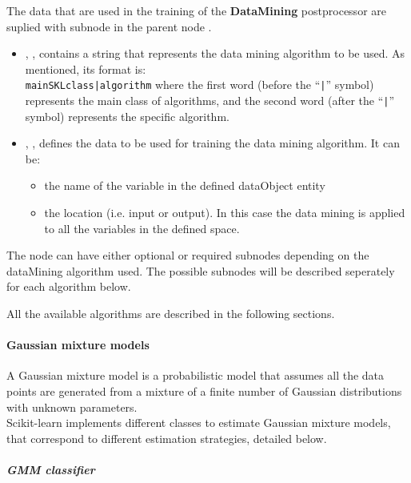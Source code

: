 The data that are used in the training of the \textbf{DataMining}
postprocessor are suplied with subnode  in the parent node
 .


\begin{itemize}
  \item {}, , contains a string that represents the data mining algorithm
  to be used.
  As mentioned, its format is:\\
  \texttt{mainSKLclass|algorithm} where the
  first word (before the ``\texttt{|}'' symbol) represents the main class of
  algorithms, and the second word (after the ``\texttt{|}'' symbol) represents
  the specific algorithm.
  \item {}, , defines the data
  to be used for training the data mining algorithm. It can be:
  \begin{itemize}
	\item the name of the variable in the defined dataObject entity
	\item the location (i.e. input or output). In this case the data mining
        is applied to all the variables in the defined space.
  \end{itemize}
\end{itemize}

The  node can have either optional or required subnodes depending
 on the dataMining algorithm used. The possible subnodes will be described seperately
 for each algorithm below.

All the available algorithms are described in the following sections.

\paragraph{Gaussian mixture models}
\label{paragraph:GMM}

A Gaussian mixture model is a probabilistic model that assumes all
 the data points are generated from a mixture of a finite number of
 Gaussian distributions with unknown parameters.
\\
Scikit-learn implements different classes to estimate Gaussian
mixture models, that correspond to different estimation strategies,
 detailed below.

\subparagraph{ GMM classifier} \hfill
\label{subparagraph:GMMClass}

